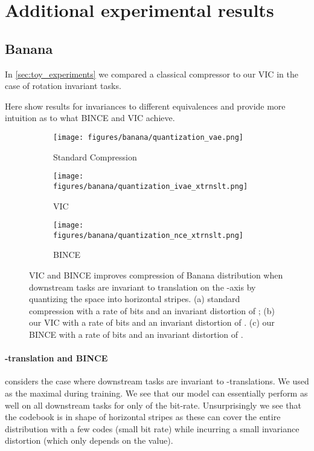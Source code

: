 \documentclass[final]{article}
\begin{document}
\clearpage
\newpage 
\section{Additional experimental results}
\label{appx:results}
\subsection{Banana}
\label{appx:banana}

In \cref{sec:toy_experiments} we compared a classical compressor to our VIC in the case of rotation invariant tasks. 


Here show results for invariances to different equivalences and provide more intuition as to what BINCE and VIC achieve.


\begin{figure}[h]
     \centering
     \begin{subfigure}[h]{0.25\columnwidth}
         \centering
         \texttt{[image: figures/banana/quantization\_vae.png]}
         \caption{Standard Compression}
         \label{fig:bananas_xtrnslt_vae}
     \end{subfigure}
\begin{subfigure}[h]{0.25\columnwidth}
         \centering
         \texttt{[image: figures/banana/quantization\_ivae\_xtrnslt.png]}
         \caption{VIC}
         \label{fig:bananas_xtrnslt_ivae}
     \end{subfigure}
\begin{subfigure}[h]{0.25\columnwidth}
         \centering
         \texttt{[image: figures/banana/quantization\_nce\_xtrnslt.png]}
         \caption{BINCE}
         \label{fig:bananas_xtrnslt_bince}
     \end{subfigure}
\caption{
VIC and BINCE improves compression of Banana distribution when downstream tasks are invariant to translation on the -axis by quantizing the space into horizontal stripes.
(a) standard compression with a rate of  bits and an invariant distortion of  ; (b) our VIC with a rate of  bits and an invariant distortion of .
(c) our BINCE with a rate of  bits and an invariant distortion of .
}
\label{fig:bananas_xtrnslt}
\vspace{-0.5em}
\end{figure} 
\paragraph{-translation and BINCE}
 considers the case where downstream tasks are invariant to -translations.
We used  as the maximal during training.
We see that our model can essentially perform as well on all downstream tasks for only  of the bit-rate.
Unsurprisingly we see that the codebook is in shape of horizontal stripes as these can cover the entire distribution with a few codes (small bit rate) while incurring a small invariance distortion (which only depends on the  value).
\end{document}
